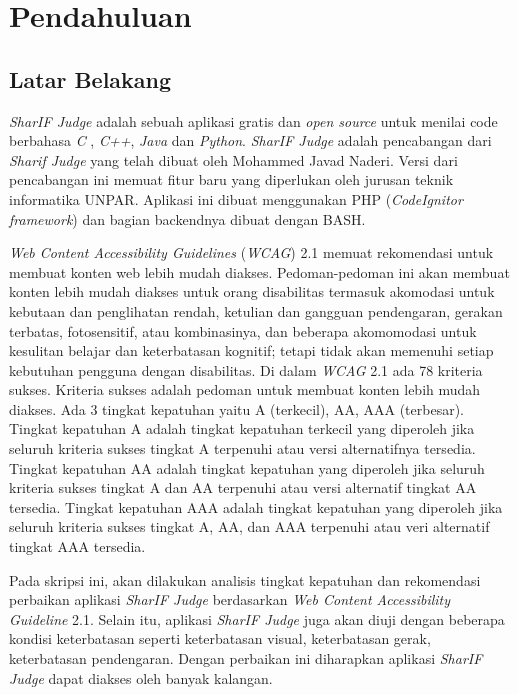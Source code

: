 \chapter{Pendahuluan}
\label{chap:intro}
   
\section{Latar Belakang}
\label{sec:label}
\textit{SharIF Judge} \cite{SharIF_Judge} adalah sebuah aplikasi gratis dan \textit{open source} untuk menilai code berbahasa \textit{C} , \textit{C++}, \textit{Java} dan \textit{Python}. \textit{SharIF Judge} adalah pencabangan dari \textit{Sharif Judge} yang telah dibuat oleh Mohammed Javad Naderi. Versi dari pencabangan ini memuat fitur baru yang diperlukan oleh jurusan teknik informatika UNPAR. Aplikasi ini dibuat menggunakan PHP (\textit{CodeIgnitor framework}) dan bagian backendnya dibuat dengan BASH.

\textit{Web Content Accessibility Guidelines} (\textit{WCAG}) 2.1 \cite{WCAG:2.1} memuat rekomendasi untuk membuat konten web lebih mudah diakses. Pedoman-pedoman ini akan membuat konten lebih mudah diakses untuk orang disabilitas termasuk akomodasi untuk kebutaan dan penglihatan rendah, ketulian dan gangguan pendengaran, gerakan terbatas, fotosensitif, atau kombinasinya, dan beberapa akomomodasi untuk kesulitan belajar dan keterbatasan kognitif; tetapi tidak akan memenuhi setiap kebutuhan pengguna dengan disabilitas. Di dalam \textit{WCAG} 2.1 ada 78 kriteria sukses. Kriteria sukses adalah pedoman untuk membuat konten lebih mudah diakses. Ada 3 tingkat kepatuhan yaitu A (terkecil), AA, AAA (terbesar). Tingkat kepatuhan A adalah tingkat kepatuhan terkecil yang diperoleh jika seluruh kriteria sukses tingkat A terpenuhi atau versi alternatifnya tersedia. Tingkat kepatuhan AA adalah tingkat kepatuhan yang diperoleh jika seluruh kriteria sukses tingkat A dan AA terpenuhi atau versi alternatif tingkat AA tersedia. Tingkat kepatuhan AAA adalah tingkat kepatuhan yang diperoleh jika seluruh kriteria sukses tingkat A, AA, dan AAA terpenuhi atau veri alternatif tingkat AAA tersedia.

Pada skripsi ini, akan dilakukan analisis tingkat kepatuhan dan rekomendasi perbaikan aplikasi \textit{SharIF Judge} berdasarkan \textit{Web Content Accessibility Guideline} 2.1. Selain itu, aplikasi \textit{SharIF Judge} juga akan diuji dengan beberapa kondisi keterbatasan seperti keterbatasan visual, keterbatasan gerak, keterbatasan pendengaran. Dengan perbaikan ini diharapkan aplikasi \textit{SharIF Judge} dapat diakses oleh banyak kalangan.

